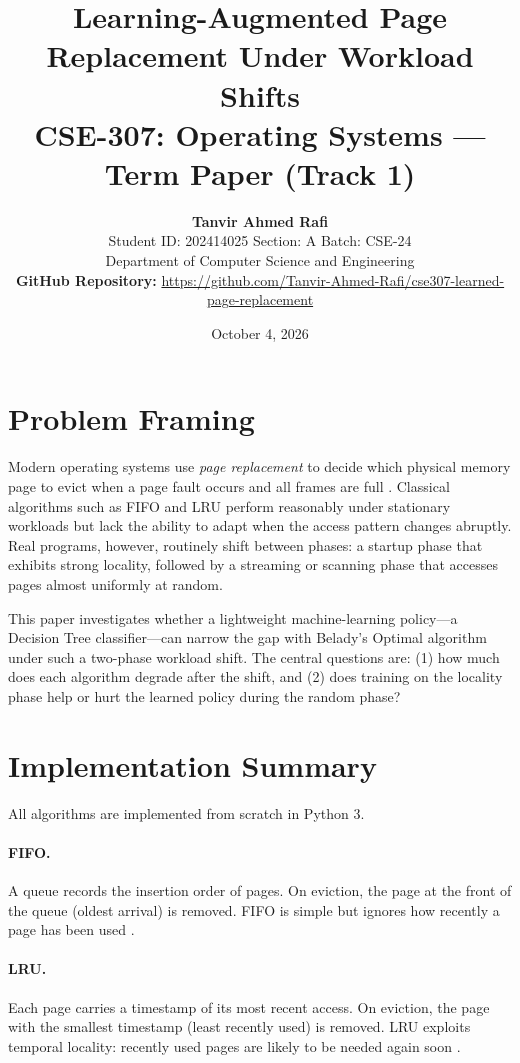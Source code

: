 \documentclass[12pt,a4paper]{article}
\title{%
  \textbf{Learning-Augmented Page Replacement Under Workload Shifts}\\[6pt]
  \large CSE-307: Operating Systems --- Term Paper (Track 1)
}
\author{%
  \textbf{Tanvir Ahmed Rafi}\\
  Student ID: 202414025 \quad\textbar\quad Section: A \quad\textbar\quad Batch: CSE-24\\
  Department of Computer Science and Engineering\\[4pt]
  \small\textbf{GitHub Repository:} \url{https://github.com/Tanvir-Ahmed-Rafi/cse307-learned-page-replacement}
}
\date{October 4, 2026}
\begin{document}
\maketitle
\thispagestyle{empty}

\section{Problem Framing}

Modern operating systems use \emph{page replacement} to decide which physical
memory page to evict when a page fault occurs and all frames are full
\cite{silberschatz2018}. Classical algorithms such as FIFO and LRU perform
reasonably under stationary workloads but lack the ability to adapt when the
access pattern changes abruptly. Real programs, however, routinely shift
between phases: a startup phase that exhibits strong locality, followed by
a streaming or scanning phase that accesses pages almost uniformly at random.

This paper investigates whether a lightweight machine-learning policy---a
Decision Tree classifier---can narrow the gap with Belady's Optimal algorithm
\cite{belady1966} under such a two-phase workload shift. The central questions
are: (1) how much does each algorithm degrade after the shift, and (2) does
training on the locality phase help or hurt the learned policy during the
random phase?

\section{Implementation Summary}

All algorithms are implemented from scratch in Python 3.

\paragraph{FIFO.} A queue records the insertion order of pages. On eviction,
the page at the front of the queue (oldest arrival) is removed. FIFO is
simple but ignores how recently a page has been used \cite{tanenbaum2015}.

\paragraph{LRU.} Each page carries a timestamp of its most recent access.
On eviction, the page with the smallest timestamp (least recently used) is
removed. LRU exploits temporal locality: recently used pages are likely to be
needed again soon \cite{silberschatz2018}.
\end{document}
